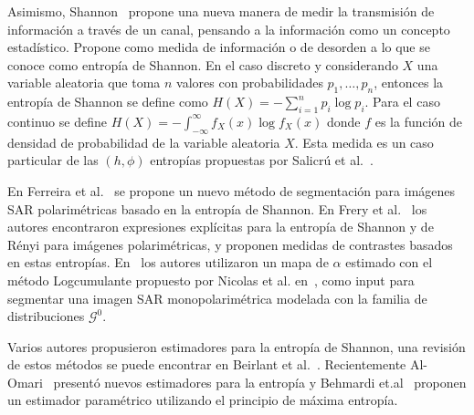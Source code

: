 \documentclass[11pt]{article}
\begin{document}
Asimismo, Shannon~\cite{Shannon1948} propone una nueva manera de medir la transmisión de información a través de un canal, pensando a la información como un concepto estadístico. Propone como medida de información o de desorden a lo que se conoce como entropía de Shannon. En el caso discreto y considerando $X$ una variable aleatoria que toma $n$ valores con probabilidades $p_1,\ldots,p_n$, entonces la entropía de Shannon se define como $H(X)=-\sum_{i=1}^n p_i \log p_i$. Para el caso continuo se define $H(X)=-\int_{-\infty}^{\infty} f_X(x) \log f_X(x)$ donde $f$ es la función de densidad de probabilidad de la variable aleatoria $X$. Esta medida es un caso particular de las $(h,\phi)$ entropías propuestas por Salicrú et al.~\cite{salicruetal1993}.

En Ferreira et al.~\cite{Ferreira2020} se propone un nuevo método de segmentación para imágenes SAR polarimétricas basado en la entropía de Shannon. En Frery et al.~\cite{Frery2012} los autores encontraron expresiones explícitas para la entropía de Shannon y de Rényi para imágenes polarimétricas, y proponen medidas de contrastes basados en estas entropías. En~\cite{Rodrigues2016} los autores utilizaron un mapa de $\alpha$ estimado con el método Logcumulante propuesto por Nicolas et al. en~\cite{Nicolas2010}, como input para segmentar una imagen SAR monopolarimétrica modelada con la familia de distribuciones $\mathcal{G}^0$.

Varios autores propusieron estimadores para la entropía de Shannon, una revisión de estos métodos se puede encontrar en Beirlant et al.~\cite{Beirlant1997}. Recientemente Al-Omari~\cite{AlOmari2013} presentó nuevos estimadores para la entropía y Behmardi et.al~\cite{Behmardi2011} proponen un estimador paramétrico utilizando el principio de máxima entropía. 


\end{document}
